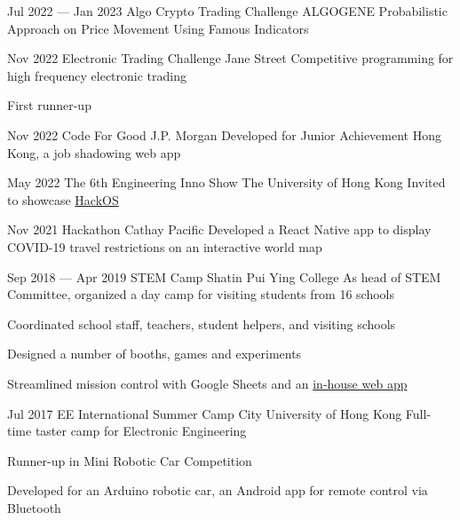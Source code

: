 \activityEntry
{Jul 2022 --- Jan 2023}
{Algo Crypto Trading Challenge}
{ALGOGENE}
{Probabilistic Approach on Price Movement Using Famous Indicators}
{}

\activityEntry
{Nov 2022}
{Electronic Trading Challenge}
{Jane Street}
{Competitive programming for high frequency electronic trading}
{
\begin{descitemize}
    \specialitem First runner-up
\end{descitemize}
}

\activityEntry
{Nov 2022}
{Code For Good}
{J.P. Morgan}
{Developed for Junior Achievement Hong Kong, a job shadowing web app}
{}

\activityEntry
{May 2022}
{The 6th Engineering Inno Show}
{The University of Hong Kong}
{Invited to showcase \hyperlink{HackOS}{HackOS}}
{}

\activityEntry
{Nov 2021}
{Hackathon}
{Cathay Pacific}
{Developed a React Native app to display COVID-19 travel restrictions on an interactive world map}
{}

\activityEntry
{Sep 2018 --- Apr 2019}
{\hypertarget{STEM_Camp_2019}{STEM Camp}}
{Shatin Pui Ying College}
{As head of STEM Committee, organized a day camp for visiting students from 16 schools}
{
\begin{descitemize}
    \item Coordinated school staff, teachers, student helpers, and visiting schools
    \item Designed a number of booths, games and experiments
    \item Streamlined mission control with Google Sheets and an \hyperlink{RTRMS}{in-house web app}
\end{descitemize}
}

\activityEntry
{Jul 2017}
{EE International Summer Camp}
{City University of Hong Kong}
{Full-time taster camp for Electronic Engineering}
{
\begin{descitemize}
    \specialitem Runner-up in Mini Robotic Car Competition
    \item Developed for an Arduino robotic car, an Android app for remote control via Bluetooth
\end{descitemize}
}